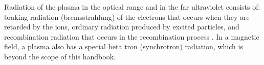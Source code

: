 Radiation of the plasma in the optical range and in the far ultraviolet consists of: braking radiation (bremsstrahlung) of the electrons that occurs when they are retarded by the ions, ordinary radiation produced by excited particles, and recombination radiation that occurs in the recombination process
. In a magnetic field, a plasma also has a special beta­ tron (synchrotron) radiation, which is beyond the scope of this handbook.
